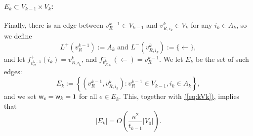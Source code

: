 \documentclass{article}
\newcommand{\eq}[1]{\hyperref[eq:#1]{(\ref*{eq:#1})}}
\renewcommand{\>}{\rangle}
\newcommand{\<}{\langle}
\renewcommand{\(}{\left(}
\renewcommand{\)}{\right)}
\def\w{{\sf w}}
\begin{document}
\paragraph{$E_k\subset V_{k-1}\times V_k$:} Finally, there is an edge between $v^{k-1}_{R}\in V_{k-1}$ and $v^k_{R,i_k}\in V_k$ for any $i_k\in A_k$, so we define 
$$L^+(v_R^{k-1}):= A_k
\mbox{ and }
L^-(v_{R,i_k}^k):=\{\leftarrow\},$$
and let $f^+_{v_R^{k-1}}(i_k)=v_{R,i_k}^k$, and $f^-_{v_{R,i_k}^k}(\leftarrow)=v_{R}^{k-1}$. We let $E_k$ be the set of such edges:
$$E_k:=\left\{(v_{R}^{k-1},v_{R,i_k}^k):v_{R}^{k-1}\in V_{k-1},i_k\in A_k\right\},$$
and we set $\w_e=\w_k=1$ for all $e\in E_k$. This, together with \eq{kVk}, implies that 
\begin{equation}
|E_k|=O\left(\frac{n^2}{t_{k-1}}|V_0|\right).
\label{eq:kEk}
\end{equation}
\end{document}
